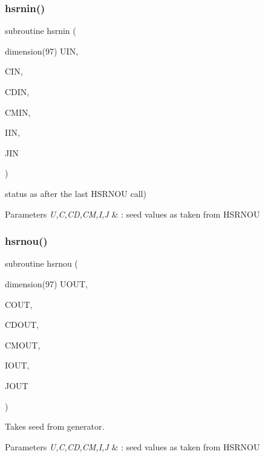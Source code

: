 \subsubsection{\texorpdfstring{hsrnin()}{hsrnin()}}
{\footnotesize\ttfamily subroutine hsrnin (\begin{DoxyParamCaption}\item[{dimension(97)}]{U\+IN,  }\item[{}]{C\+IN,  }\item[{}]{C\+D\+IN,  }\item[{}]{C\+M\+IN,  }\item[{}]{I\+IN,  }\item[{}]{J\+IN }\end{DoxyParamCaption})}



status as after the last H\+S\+R\+N\+OU call) 


\begin{DoxyParams}{Parameters}
{\em U,C,CD,CM,I,J} & \+: seed values as taken from H\+S\+R\+N\+OU \\
\hline
\end{DoxyParams}
\mbox{\label{djangoh__h_8f_a0c8e4208bf8844ec9fe1475008626308}} 
\subsubsection{\texorpdfstring{hsrnou()}{hsrnou()}}
{\footnotesize\ttfamily subroutine hsrnou (\begin{DoxyParamCaption}\item[{dimension(97)}]{U\+O\+UT,  }\item[{}]{C\+O\+UT,  }\item[{}]{C\+D\+O\+UT,  }\item[{}]{C\+M\+O\+UT,  }\item[{}]{I\+O\+UT,  }\item[{}]{J\+O\+UT }\end{DoxyParamCaption})}



Takes seed from generator. 


\begin{DoxyParams}{Parameters}
{\em U,C,CD,CM,I,J} & \+: seed values as taken from H\+S\+R\+N\+OU \\
\hline
\end{DoxyParams}
\mbox{\label{djangoh__h_8f_a54e057d1ece2367e4e29d6b22165af73}} 
